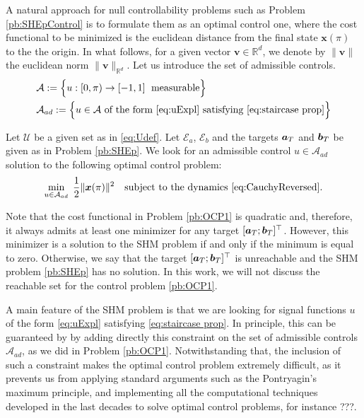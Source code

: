 \documentclass[9pt,shortpaper,twoside,web]{ieeecolor}
\begin{document}
A natural approach for null controllability problems such as Problem \ref{pb:SHEpControl} is to formulate them as an optimal control one, where the cost functional to be minimized is the euclidean distance from the final state $\bm{x}(\pi)$ to the the origin. In what follows, for a given vector $\bm{v}\in\mathbb{R}^d$, we  denote by $\|\bm{v}\|$ the euclidean norm $\|\bm{v}\|_{\mathbb{R}^d}$.  
Let us introduce the set of admissible controls.
\begin{align*}
	&\mathcal A:= \Big\{u:[0,\pi)\to [-1,1]\; \text{ measurable}\Big\}
	\\
	&\mathcal A_{ad}:= \Big\{u\in\mathcal A \text{ of the form } \eqref{eq:uExpl} \text{ satisfying } \eqref{eq:staircase prop}\Big\}
\end{align*}

\begin{problem}\label{pb:OCP1}
	Let $\mathcal{U}$ be a given set as in \eqref{eq:Udef}. Let $\mathcal{E}_a$, $\mathcal{E}_b$ and the targets $\bm{a}_T$ and $\bm{b}_T$ be given as in Problem \ref{pb:SHEp}. We look for an admissible control $u\in \mathcal{A}_{ad}$ solution to the following optimal control problem:
	\begin{equation*}
		\min_{u \in \mathcal{A}_{ad}}\;\frac 12 \|\bm{x}(\pi)\|^2 \quad \text{subject to the dynamics \eqref{eq:CauchyReversed}}.
	\end{equation*}
\end{problem}

\begin{remark}
	Note that the cost functional in Problem \ref{pb:OCP1} is quadratic and, therefore, it always admits at least one minimizer for any target $[\bm{a}_T;\bm{b}_T]^\top$. However, this minimizer is a solution to the SHM problem if and only if the minimum is equal to zero. Otherwise, we say that the target $[\bm{a}_T;\bm{b}_T]^\top$ is unreachable and the SHM problem \ref{pb:SHEp} has no solution.  In this work, we will not discuss the reachable set for the control problem \eqref{pb:OCP1}.
\end{remark}

A main feature of the SHM problem is that we are looking for signal functions $u$ of the form \eqref{eq:uExpl} satisfying \eqref{eq:staircase prop}. In principle, this can be guaranteed by by adding directly this constraint on the set of admissible controls $\mathcal{A}_{ad}$, as we did in Problem \ref{pb:OCP1}. Notwithstanding that, the inclusion of such a constraint makes the optimal control problem extremely difficult, as it prevents us from applying standard arguments such as the Pontryagin's maximum principle, and implementing all the computational techniques developed in the last decades to solve optimal control problems, {\color{red} for instance ???}. %
\end{document}
